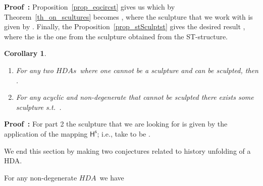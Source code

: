 \documentclass[submission,copyright,creativecommons]{eptcs}
\newtheorem{corollary}[theorem]{Corollary}
\newenvironment{proof}[1][\!\!\,]{\vspace{1ex}\noindent\textbf{Proof #1: }}{\hfill\vspace{2ex}}
\newcommand\HDA{\ensuremath{\mathit{HDA}}}
\newcommand\HDAs{\ensuremath{\mathit{HDAs}}}
\newcommand\stintoh{\ensuremath{\mathsf{H}}}
\newcommand\stintosculpture{\ensuremath{\stintoh^{\mathsf{s}}}}
\begin{document}
\begin{proof}
Proposition~\ref{prop_eqcircst} gives us  which by Theorem~\ref{th_on_scultures} becomes , where the sculpture  that we work with is given by . Finally, the Proposition~\ref{prop_stSculptst} gives the desired result , where the  is the one from the sculpture  obtained from the ST-structure.
\end{proof}



\begin{corollary}
\ 

\begin{enumerate}
\item For any two \HDAs\ where one  cannot be a sculpture and  can be sculpted, then .

\item For any acyclic and non-degenerate  that cannot be sculpted there exists some sculpture  s.t.\ .
\end{enumerate}
\end{corollary}

\begin{proof}
For part 2 the sculpture that we are looking for is given by the application of the mapping \stintosculpture; i.e., take  to be .
\end{proof}

We end this section by making two conjectures related to history unfolding of a HDA. 

For any non-degenerate \HDA\  we have
\end{document}
